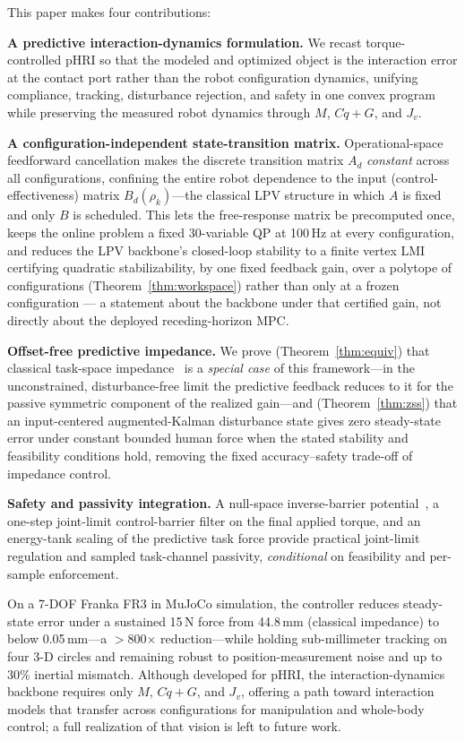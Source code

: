 \documentclass[journal]{IEEEtran}
\begin{document}
This paper makes four contributions:

\textbf{A predictive interaction-dynamics formulation.} We recast
torque-controlled pHRI so that the modeled and optimized object is the
interaction error at the contact port rather
than the robot configuration dynamics, unifying compliance, tracking,
disturbance rejection, and safety in one convex program while preserving the
measured robot dynamics through $M$, $C\dot q+G$, and $J_v$.

\textbf{A configuration-independent state-transition matrix.} Operational-space
feedforward cancellation makes the discrete transition matrix $A_d$ \emph{constant}
across all configurations, confining the entire robot dependence to the input
(control-effectiveness) matrix $B_d(\rho_k)$---the classical LPV structure in
which $A$ is fixed and only $B$ is scheduled. This lets the free-response matrix
be precomputed once, keeps the online problem a fixed 30-variable QP at 100\,Hz
at every configuration, and reduces the LPV backbone's closed-loop stability to
a finite vertex LMI certifying quadratic stabilizability, by one fixed
feedback gain, over a polytope of configurations
(Theorem~\ref{thm:workspace}) rather than only at a frozen configuration ---
a statement about the backbone under that certified gain, not directly about
the deployed receding-horizon MPC.

\textbf{Offset-free predictive impedance.} We prove
(Theorem~\ref{thm:equiv}) that classical task-space
impedance~\cite{hogan1985impedance} is a \emph{special case} of this
framework---in the unconstrained, disturbance-free limit the predictive
feedback reduces to it for the passive symmetric component of the realized
gain---and (Theorem~\ref{thm:zss}) that an input-centered augmented-Kalman
disturbance state gives zero steady-state error under constant bounded human
force when the stated stability and feasibility conditions hold, removing the
fixed accuracy--safety trade-off of impedance control.

\textbf{Safety and passivity integration.} A null-space
inverse-barrier potential~\cite{sadeghian2014task}, a one-step joint-limit
control-barrier filter on the final applied torque, and an energy-tank scaling
of the predictive task force provide practical joint-limit regulation and
sampled task-channel passivity, \emph{conditional} on feasibility and
per-sample enforcement.

On a 7-DOF Franka FR3 in MuJoCo simulation, the controller reduces
steady-state error under a sustained 15\,N force from 44.8\,mm (classical
impedance) to below 0.05\,mm---a $>$800$\times$ reduction---while holding
sub-millimeter tracking on four 3-D circles and remaining robust to
position-measurement noise and up to 30\% inertial mismatch. Although developed for pHRI, the
interaction-dynamics backbone requires only $M$, $C\dot q+G$, and $J_v$,
offering a path toward interaction models that transfer across configurations
for manipulation and whole-body control; a full realization of that vision is
left to future work.
\end{document}
